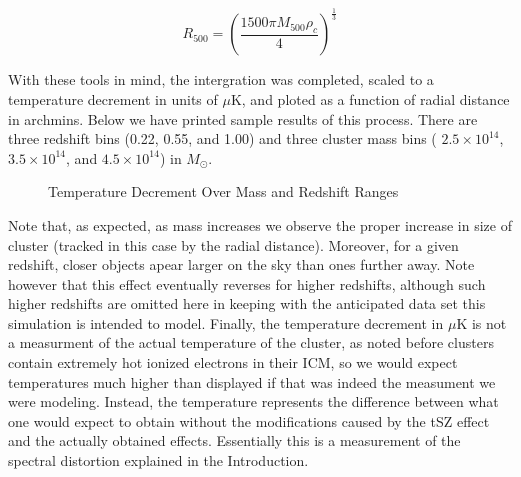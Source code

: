 \documentclass[12pt]{article} %
\begin{document}
\begin{equation}
R_{500} = (\frac{1500\pi M_{500}\rho_c}{4})^\frac{1}{3}
\end{equation}

With these tools in mind, the intergration was completed, scaled to a temperature decrement in units of $\mu$K, and ploted as a function of radial distance in archmins. Below we have printed sample results of this process. There are three redshift bins (0.22, 0.55, and 1.00) and three cluster mass bins ( $2.5\times 10^{14}$,  $3.5\times 10^{14}$, and  $4.5\times 10^{14}$) in $M_{\odot}$. 


\begin{figure}[!ht]
    \hfill
    \hfill
    \vfill
    \hfill
    \hfill
    \vfill
    \hfill
    \hfill
    \caption{Temperature Decrement Over Mass and Redshift Ranges}
    \label{fig:dummy}
  \end{figure}


Note that, as expected, as mass increases we observe the proper increase in size of cluster (tracked in this case by the radial distance). Moreover, for a given redshift, closer objects apear larger on the sky than ones further away. Note however that this effect eventually reverses for higher redshifts, although such higher redshifts are omitted here in keeping with the anticipated data set this simulation is intended to model. Finally, the temperature decrement in $\mu$K is not a measurment of the actual temperature of the cluster, as noted before clusters contain extremely hot ionized electrons in their ICM, so we would expect temperatures much higher than displayed if that was indeed the measument we were modeling. Instead, the temperature represents the difference between what one would expect to obtain without the modifications caused by the tSZ effect and the actually obtained effects. Essentially this is a measurement of the spectral distortion explained in the Introduction. 
\end{document}
